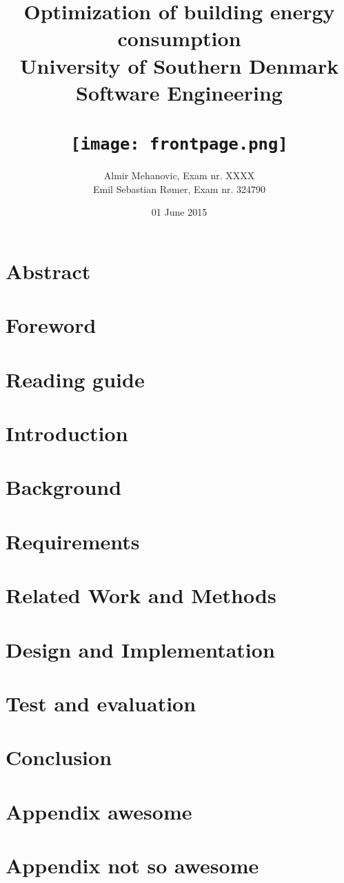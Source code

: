 \documentclass[35pt]{report}
\title{
	{Optimization of building energy consumption}\\
	{\large University of Southern Denmark \\Software Engineering\\}\\
	{\texttt{[image: frontpage.png]}}
}
\author{Almir Mehanovic, Exam nr. XXXX\\Emil Sebastian Rømer, Exam nr. 324790}
\date{01 June 2015}
\begin{document}
\maketitle

\chapter*{Abstract}


\chapter*{Foreword}


\tableofcontents

\chapter*{Reading guide}


\chapter{Introduction}


\chapter{Background}


\chapter{Requirements}


\chapter{Related Work and Methods}


\chapter{Design and Implementation}

\chapter{Test and evaluation}

\chapter{Conclusion}

\appendix
\chapter{Appendix awesome}

\chapter{Appendix not so awesome}

\end{document}
